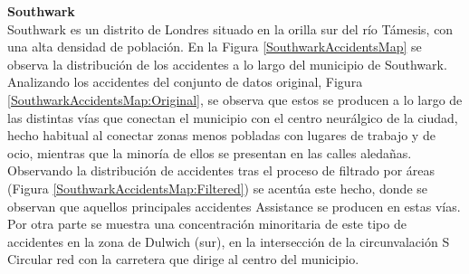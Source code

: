 \documentclass{uathesis-es}
\begin{document}
\textbf{Southwark}\\

Southwark es un distrito de Londres situado en la orilla sur del río Támesis, con una alta densidad de población. En la Figura \ref{SouthwarkAccidentsMap} se observa la distribución de los accidentes a lo largo del municipio de Southwark. Analizando los accidentes del conjunto de datos original, Figura \ref{SouthwarkAccidentsMap:Original}, se observa que estos se producen a lo largo de las distintas vías que conectan el municipio con el centro neurálgico de la ciudad, hecho habitual al conectar zonas menos pobladas con lugares de trabajo y de ocio, mientras que la minoría de ellos se presentan en las calles aledañas. Observando la distribución de accidentes tras el proceso de filtrado por áreas (Figura \ref{SouthwarkAccidentsMap:Filtered}) se acentúa este hecho, donde se observan que aquellos principales accidentes Assistance se producen en estas vías. Por otra parte se muestra una concentración minoritaria de este tipo de accidentes en la zona de Dulwich (sur), en la intersección de la circunvalación S Circular red con la carretera que dirige al centro del municipio.
\end{document}
